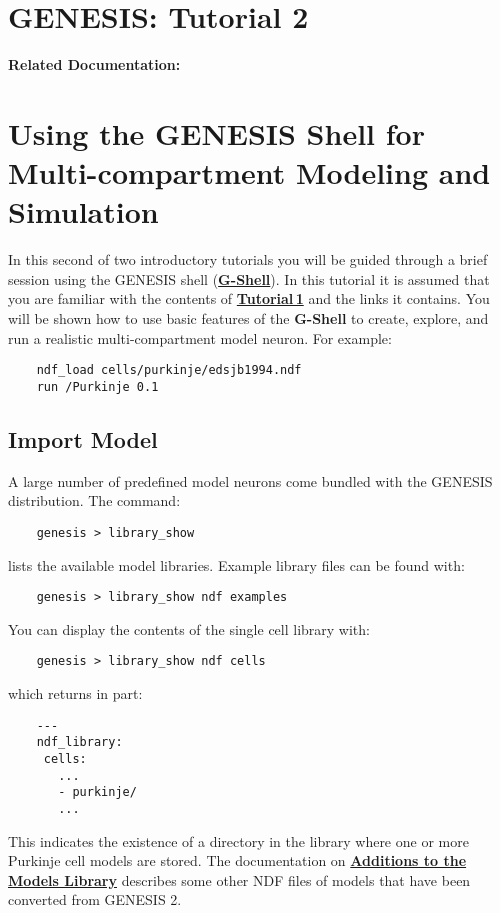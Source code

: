 \documentclass[12pt]{article}
\begin{document}
\section*{GENESIS: Tutorial 2}

{\bf Related Documentation:}

\section*{Using the GENESIS Shell for\\Multi-compartment Modeling and Simulation}

In this second of two introductory tutorials you will be guided through a brief session using the GENESIS shell (\href{../gshell/gshell.tex}{\bf G-Shell}). In this tutorial it is assumed that you are familiar with the contents of \href{../tutorial1/tutorial1.tex}{\bf Tutorial\,1} and the links it contains. You will be shown how to use basic features of the {\bf G-Shell} to create, explore, and run a realistic multi-compartment model neuron. For example:
\begin{verbatim}
    ndf_load cells/purkinje/edsjb1994.ndf
    run /Purkinje 0.1
\end{verbatim}

\subsection*{Import Model}

A large number of predefined model neurons come bundled with the GENESIS distribution. The command:
\begin{verbatim}
    genesis > library_show
\end{verbatim}
lists the available model libraries. Example library files can be found with:
\begin{verbatim}
    genesis > library_show ndf examples
\end{verbatim}
You can display the contents of the single cell library with:
\begin{verbatim}
    genesis > library_show ndf cells
\end{verbatim}
which returns in part:
\begin{verbatim}
    ---
    ndf_library:
     cells:
       ...
       - purkinje/
       ...
\end{verbatim}
This indicates the existence of a directory in the library where one or more Purkinje cell models are stored.
The documentation on \href{../models-library-additions/models-library-additions.html}{\bf Additions to the Models Library}
describes some other NDF files of models that have been converted from GENESIS 2.
\end{document}
